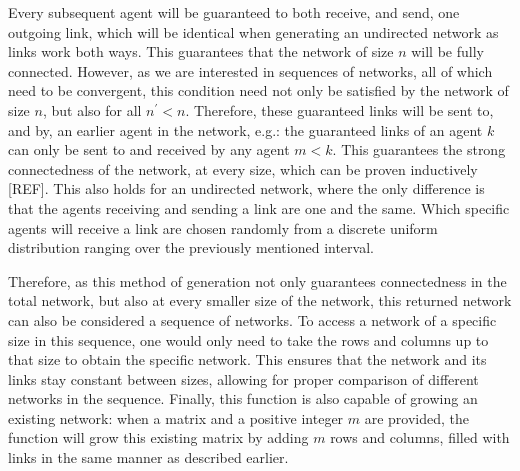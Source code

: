 \documentclass{article}
\begin{document}
Every subsequent agent will be guaranteed to both receive, and send, one outgoing link, which will be identical when generating an undirected network as links work both ways. This guarantees that the network of size $n$ will be fully connected. However, as we are interested in sequences of networks, all of which need to be convergent, this condition need not only be satisfied by the network of size $n$, but also for all $n^{\prime} < n$. Therefore, these guaranteed links will be sent to, and by, an earlier agent in the network, e.g.: the guaranteed links of an agent $k$ can only be sent to and received by any agent $m < k$. This guarantees the strong connectedness of the network, at every size, which can be proven inductively [REF]. This also holds for an undirected network, where the only difference is that the agents receiving and sending a link are one and the same. Which specific agents will receive a link are chosen randomly from a discrete uniform distribution ranging over the previously mentioned interval. \newline

Therefore, as this method of generation not only guarantees connectedness in the total network, but also at every smaller size of the network, this returned network can also be considered a sequence of networks. To access a network of a specific size in this sequence, one would only need to take the rows and columns up to that size to obtain the specific network. This ensures that the network and its links stay constant between sizes, allowing for proper comparison of different networks in the sequence. Finally, this function is also capable of growing an existing network: when a matrix and a positive integer $m$ are provided, the function will grow this existing matrix by adding $m$ rows and columns, filled with links in the same manner as described earlier.\newline
\end{document}
